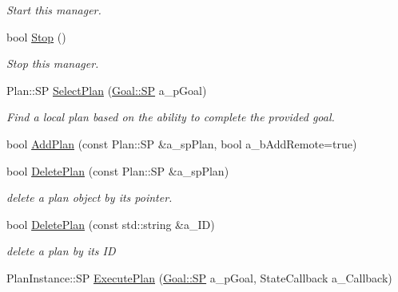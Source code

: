 \begin{DoxyCompactItemize}
\begin{DoxyCompactList}\small\item\em Start this manager. \end{DoxyCompactList}\item 
\mbox{\label{class_plan_manager_af9a35cd7a12a5d97e5716326a8a46285}} 
bool \hyperlink{class_plan_manager_af9a35cd7a12a5d97e5716326a8a46285}{Stop} ()
\begin{DoxyCompactList}\small\item\em Stop this manager. \end{DoxyCompactList}\item 
\mbox{\label{class_plan_manager_a857f99e0cc17c4a5206d509dfb66bfa2}} 
Plan\+::\+SP \hyperlink{class_plan_manager_a857f99e0cc17c4a5206d509dfb66bfa2}{Select\+Plan} (\hyperlink{class_goal_a818ae12a4d1f28bd433dab2a830a390e}{Goal\+::\+SP} a\+\_\+p\+Goal)
\begin{DoxyCompactList}\small\item\em Find a local plan based on the ability to complete the provided goal. \end{DoxyCompactList}\item 
bool \hyperlink{class_plan_manager_ad53eba96fe9bf9551eec3281d9bcb6db}{Add\+Plan} (const Plan\+::\+SP \&a\+\_\+sp\+Plan, bool a\+\_\+b\+Add\+Remote=true)
\item 
\mbox{\label{class_plan_manager_a0aabef93b6da1a6bd3dafdad26353827}} 
bool \hyperlink{class_plan_manager_a0aabef93b6da1a6bd3dafdad26353827}{Delete\+Plan} (const Plan\+::\+SP \&a\+\_\+sp\+Plan)
\begin{DoxyCompactList}\small\item\em delete a plan object by it\textquotesingle{}s pointer. \end{DoxyCompactList}\item 
\mbox{\label{class_plan_manager_affeec742082c496f258068a1aebf594d}} 
bool \hyperlink{class_plan_manager_affeec742082c496f258068a1aebf594d}{Delete\+Plan} (const std\+::string \&a\+\_\+\+ID)
\begin{DoxyCompactList}\small\item\em delete a plan by it\textquotesingle{}s ID \end{DoxyCompactList}\item 
Plan\+Instance\+::\+SP \hyperlink{class_plan_manager_a6208be809c2d01d556dfa4f56aa5e1b6}{Execute\+Plan} (\hyperlink{class_goal_a818ae12a4d1f28bd433dab2a830a390e}{Goal\+::\+SP} a\+\_\+p\+Goal, State\+Callback a\+\_\+\+Callback)
\end{DoxyCompactItemize}


